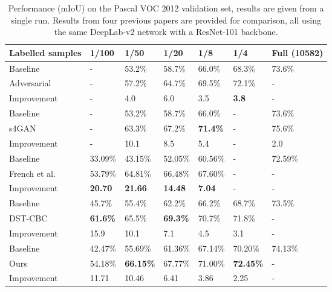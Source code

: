 \documentclass[10pt,twocolumn,letterpaper]{article}
\begin{document}
\begin{table*}[tp!]
    \centering
    \caption{Performance (mIoU) on the Pascal VOC 2012 validation set, results are given from a single run. Results from four previous papers are provided for comparison, all using the same DeepLab-v2 network with a ResNet-101 backbone.}
    \begin{tabular}{ l l l l l l l}
        Labelled samples & 1/100 & 1/50 & 1/20 & 1/8 & 1/4 & Full (10582) \\
        \hline \hline
        
        Baseline & - & 53.2\%\footnotemark & 58.7\%\footnotemark[\value{footnote}] & 66.0\% & 68.3\% & 73.6\% \\
        Adversarial \cite{Hung} & - & 57.2\%\footnotemark[\value{footnote}] & 64.7\%\footnotemark[\value{footnote}] & 69.5\% & 72.1\% & - \\
        Improvement & - & 4.0 & 6.0 & 3.5 & \textbf{3.8} & - \\
        \hline \hline
        
        Baseline & - & 53.2\% & 58.7\% & 66.0\% & - & 73.6\%  \\
        s4GAN \cite{Mittal} & - & 63.3\% & 67.2\% & \textbf{71.4\%} & - & 75.6\% \\
        Improvement & - & 10.1 & 8.5 & 5.4 & - & 2.0 \\
        \hline \hline
        
        Baseline & 33.09\% & 43.15\% & 52.05\% & 60.56\% & - & 72.59\% \\
        French et al. \cite{French}\footnotemark & 53.79\% & 64.81\% & 66.48\% & 67.60\% & - & - \\
         Improvement & \textbf{20.70} & \textbf{21.66} & \textbf{14.48} & \textbf{7.04} & - & - \\
        \hline \hline
        
        Baseline & 45.7\%\footnotemark & 55.4\% & 62.2\% & 66.2\% & 68.7\% & 73.5\% \\
        DST-CBC \cite{Feng} & \textbf{61.6\%}\footnotemark[\value{footnote}]  & 65.5\% & \textbf{69.3\%} & 70.7\% & 71.8\% & - \\
        Improvement & 15.9 & 10.1 & 7.1 & 4.5 & 3.1 & - \\
        \hline \hline
        
        Baseline & 42.47\% & 55.69\% & 61.36\% & 67.14\% & 70.20\% & 74.13\% \\

        Ours & 54.18\% & \textbf{66.15\%} & 67.77\% & 71.00\% & \textbf{72.45\%} & - \\

        Improvement & 11.71 & 10.46 & 6.41 & 3.86 & 2.25 & - \\
        \hline
        
    \end{tabular}
    \label{tab:pascalresults}
\end{table*}{}
\end{document}
